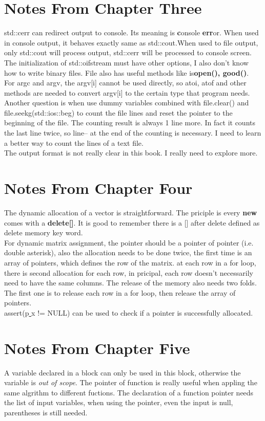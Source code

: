 \documentclass[11pt]{article}
\begin{document}
\section{Notes From Chapter Three}
std::cerr can redirect output to console. Its meaning is \textbf{c}onsole \textbf{err}or. When used in console output, it behaves exactly same as std::cout.When used to file output, only std::cout will process output, std::cerr will be processed to console screen.\\
The initialization of std::oifstream must have other options, I also don't know how to write binary files. File also has useful methods like is\textbf{open(), good()}.\\
For argc and argv, the argv[i] cannot be used directly, so atoi, atof and other methods are needed to convert argv[i] to the certain type that program needs.\\
Another question is when use dummy variables combined with file.clear() and file.seekg(std::ios::beg) to count the file lines and reset the pointer to the beginning of the file. The counting result is always 1 line more. In fact it counts the last line twice, so line-- at the end of the counting is necessary. I need to learn a better way to count the lines of a text file.\\
The output format is not really clear in this book. I really need to explore more.
\section{Notes From Chapter Four}
The dynamic allocation of a vector is straightforward. The priciple is every \textbf{new} comes with a \textbf{delete[]}. It is good to remember there is a [] after delete defined as delete memory key word.\\
For dynamic matrix assignment, the pointer should be a pointer of pointer (i.e. double asterisk), also the allocation needs to be done twice, the first time is an array of pointers, which defines the row of the matrix. at each row in a for loop, there is second allocation for each row, in pricipal, each row doesn't necessarily need to have the same columns. The release of the memory also needs two folds. The first one is to release each row in a for loop, then release the array of pointers.\\
assert(p\underline{ }x != NULL) can be used to check if a pointer is successfully allocated.
\section{Notes From Chapter Five}
A variable declared in a block can only be used in this block, otherwise the variable is \emph{out of scope}. 
The pointer of function is really useful when appling the same algrithm to different fuctions. The declaration of a function pointer needs the list of input variables, when using the pointer, even the input is null, parentheses is still needed.
\end{document}
